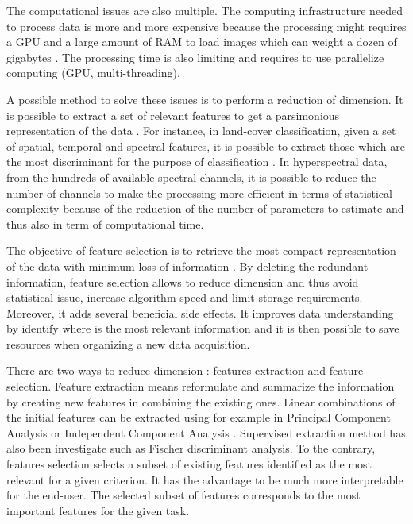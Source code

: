 \documentclass[journal]{IEEEtran}
\begin{document}
The computational issues are also multiple. The computing infrastructure needed to process data is more and more expensive because the processing might requires a GPU and a large amount of RAM to load images which can weight a dozen of gigabytes \cite{christophe2011remote}\cite{plaza2011high}. The processing time is also limiting and requires to use parallelize computing (GPU, multi-threading).

A possible method to solve these issues is to perform a reduction of dimension. It is possible to extract a set of relevant features to get a parsimonious representation of the data \cite{jimenez1998supervised}. For instance, in land-cover classification, given a set of spatial, temporal and spectral features, it is possible to extract those which are the most discriminant for the purpose of classification \cite{fassnacht2014comparison}. In hyperspectral data, from the hundreds of available spectral channels, it is possible to reduce the number of channels to make the processing more efficient in terms of statistical complexity because of the reduction of the number of parameters to estimate and thus also in term of computational time.

The objective of feature selection is to retrieve the most compact representation of the data with minimum loss of information \cite{Guyon:2006:FEF:1208773}. By deleting the redundant information, feature selection allows to reduce dimension and thus avoid statistical issue, increase algorithm speed and limit storage requirements. Moreover, it adds several beneficial side effects. It improves data understanding by identify where is the most relevant information and it is then possible to save resources when organizing a new data acquisition.

There are two ways to reduce dimension \cite{Guyon:2006:FEF:1208773}: features extraction and feature selection. Feature extraction means reformulate and summarize the information by creating new features in combining the existing ones. Linear combinations of the initial features can be extracted using for example in Principal Component Analysis \cite{jimenez1998supervised} or Independent Component Analysis \cite{villa2011hyperspectral}. Supervised extraction method has also been investigate such as Fischer discriminant analysis. To the contrary, features selection selects a subset of existing features identified as the most relevant for a given criterion. It has the advantage to be much more interpretable for the end-user. The selected subset of features corresponds to the most important features for the given task.
\end{document}
